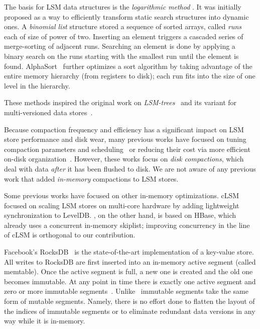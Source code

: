 The basis for LSM data structures is the \emph{logarithmic
method} \cite{Bentley79}.
It was initially
proposed as a way to efficiently transform static search structures into dynamic ones.
A \emph{binomial list} structure stored a sequence of sorted arrays, called
\emph{runs} each of size of power of two. Inserting an element triggers a
cascaded series of merge-sorting of adjacent runs. Searching an
element is done by applying a binary search on the runs starting with the
smallest run until the element is found.
AlphaSort~\cite{Nyberg95} further optimizes a sort algorithm by taking advantage of the entire memory hierarchy (from registers to disk); each run fits into the size of one level in the hierarchy.

These methods inspired the original work on
\emph{LSM-trees}~\cite{O'Neil1996} and its variant for multi-versioned
data stores~\cite{Muth1998}. 




Because compaction frequency and efficiency has a significant impact on LSM store performance and disk wear, 
many previous works have focused on tuning compaction parameters and scheduling~\cite{hbasetuning,rocksdb,
scylladbcompaction,universalcompaction,Sears:2012} or reducing their cost via more efficient on-disk organization~\cite{wisckey}. 
However, these works focus on \emph{disk compactions},
which deal with data \emph{after} it has been flushed to disk. We are not aware of any previous work that 
added \emph{in-memory} compactions to LSM stores.

Some previous works have focused on other in-memory optimizations. 
cLSM~\cite{clsm} focused on scaling LSM stores on multi-core hardware by adding lightweight synchronization to LevelDB. 
\sys, on the other hand, is based on HBase, which already uses a concurrent in-memory skiplist; improving concurrency
in the line of cLSM is orthogonal to our contribution.  

Facebook's RocksDB~\cite{rocksdb} is the state-of-the-art implementation of a key-value store.
All writes to RocksDB are first inserted into an in-memory active segment (called memtable). Once the active segment is full, a new one is created and the old one becomes immutable. At any point in time there is exactly one active segment and zero or more immutable segments~\cite{rocksdbtuning}. Unlike \sys\  immutable segments take the same form of mutable segments. Namely, there is no effort done to flatten the layout of the indices of immutable segments or to eliminate redundant data versions in any way while it is in-memory.

